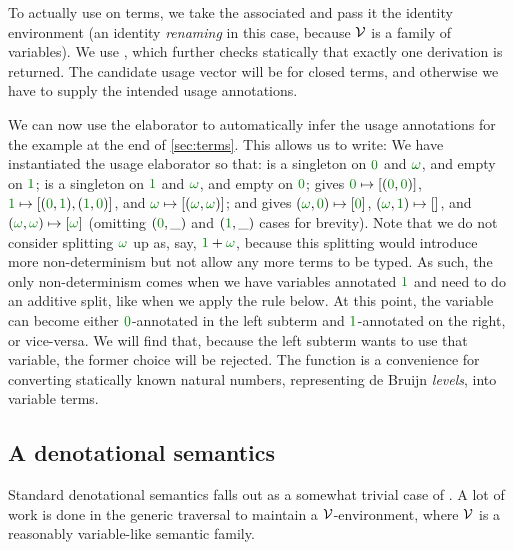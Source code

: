 
To actually use  on terms, we take the associated
 and pass it the identity environment (an identity
\emph{renaming} in this case, because $\mathcal V$ is a family of variables).
We use , which further
checks statically that exactly one derivation is returned.
The candidate usage vector  will be \AgdaFunction{[]} for closed
terms, and otherwise we have to supply the intended usage annotations.

We can now use the elaborator to automatically infer the usage
annotations for the example at the end of \cref{sec:terms}. This
allows us to write:
We have instantiated the usage elaborator so that:
 is a singleton on $\gr0$ and $\gr\omega$, and
empty on $\gr1$;  is a singleton on $\gr1$ and
$\gr\omega$, and empty on $\gr0$;  gives $\gr0
\mapsto [(\gr0,\gr0)]$, $\gr1 \mapsto [(\gr0,\gr1),(\gr1,\gr0)]$, and
$\gr\omega \mapsto [(\gr\omega,\gr\omega)]$; and 
gives $(\gr\omega, \gr0) \mapsto [\gr0]$, $(\gr\omega, \gr1) \mapsto
[]$, and $(\gr\omega, \gr\omega) \mapsto [\gr\omega]$ (omitting
$(\gr0, \_)$ and $(\gr1, \_)$ cases for brevity). Note that we do not
consider splitting $\gr\omega$ up as, say, $\gr1 + \gr\omega$, because
this splitting would introduce more non-determinism but not allow any
more terms to be typed. As such, the only non-determinism comes when
we have variables annotated $\gr1$ and need to do an additive split,
like when we apply the  rule below. At
this point, the variable can become either $\gr0$-annotated in the
left subterm and $\gr1$-annotated on the right, or vice-versa. We will
find that, because the left subterm wants to use that variable, the
former choice will be rejected. The function  is a
convenience for converting statically known natural numbers,
representing de Bruijn \emph{levels}, into variable terms.


\subsection{A denotational semantics}

Standard denotational semantics falls out as a somewhat trivial case of
.
A lot of work is done in the generic traversal  to
maintain a $\mathcal V$-environment, where $\mathcal V$ is a reasonably variable-like semantic
family.

